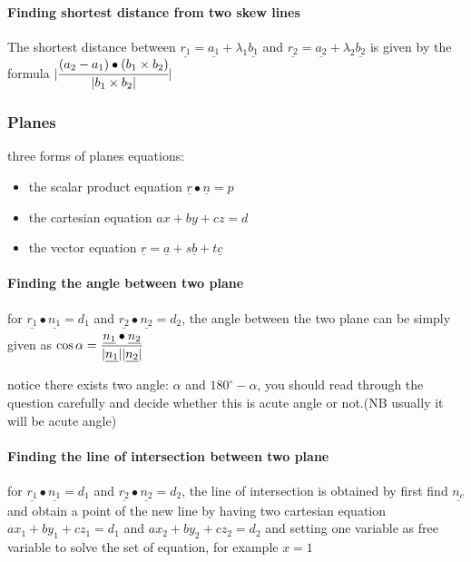 \documentclass[]{article}
\let\oldparagraph\paragraph
\renewcommand{\paragraph}[1]{\oldparagraph{#1}\mbox{}}
\begin{document}
\paragraph{Finding shortest distance from two skew
lines}\label{header-n274}

The shortest distance between
\(\underline{r_1} = \underline{a_1}+\lambda_1 \underline{b_1}\) and
\(\underline{r_2} = \underline{a_2}+\lambda_2 \underline{b_2}\) is given
by the formula
\(|\cfrac{(a_2-a_1)\bullet(b_1\times b_2)}{|b_1 \times b_2|}|\)

\subsubsection{Planes}\label{header-n276}

three forms of planes equations:

\begin{itemize}
\item
  the scalar product equation \(\underline{r}\bullet\underline{n} = p\) 
\item
  the cartesian equation \(ax + by+ cz = d\)
\item
  the vector equation
  \(\underline{r} = \underline{a} + s\underline{b} + t\underline{c}\)
\end{itemize}

\paragraph{Finding the angle between two plane}\label{header-n285}

for \(\underline{r_1}\bullet\underline{n_1} = d_1\) and
\(\underline{r_2}\bullet\underline{n_2} = d_2\), the angle between the
two plane can be simply given as
\(\cos{\alpha} = \cfrac{\underline{n_1}\bullet\underline{n_2}}{|\underline{n_1}||\underline{n_2}|}\)

notice there exists two angle: \(\alpha\) and \(180^{\circ} - \alpha\),
you should read through the question carefully and decide whether this
is acute angle or not.(NB usually it will be acute angle)

\paragraph{Finding the line of intersection between two
plane}\label{header-n288}

for \(\underline{r_1}\bullet\underline{n_1} = d_1\) and
\(\underline{r_2}\bullet\underline{n_2} = d_2\), the line of
intersection is obtained by first find \(\underline{n_c}\) and obtain a
point of the new line by having two cartesian equation
\(ax_1 + by_1+ cz_1 = d_1\) and \(ax_2 + by_2+ cz_2 = d_2\) and setting
one variable as free variable to solve the set of equation, for example
\(x = 1\)
\end{document}
